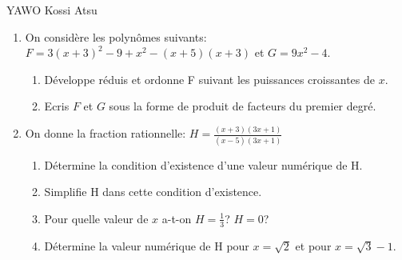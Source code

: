 \documentclass[12pt,a4paper]{book}
\newcommand{\prof}{YAWO Kossi Atsu}
\begin{document}
\begin{revision}{\prof}
\begin{exo}
\begin{enumerate}
\item On considère les polynômes suivants:\\
$F=3(x+3)^2-9+x^2-(x+5)(x+3)$ et $G=9x^2-4$.
\begin{enumerate}
\item Développe réduis et ordonne F suivant les puissances croissantes de $x$.
\item Ecris $F$ et $G$ sous la forme de produit de facteurs du premier degré.
\end{enumerate}
\item On donne la fraction rationnelle: $H=\frac{(x+3)(3x+1)}{(x-5)(3x+1)}$
\begin{enumerate}
\item Détermine la condition d'existence d'une valeur numérique de H.
\item Simplifie H dans cette condition d'existence.
\item Pour quelle valeur de $x$ a-t-on $H=\frac{1}{3}$? $H=0$?
\item Détermine la valeur numérique de H pour $x=\sqrt{2}$ et pour $x=\sqrt{3}-1$.
\end{enumerate}
\end{enumerate}
\end{exo}


\end{revision}
\end{document}
